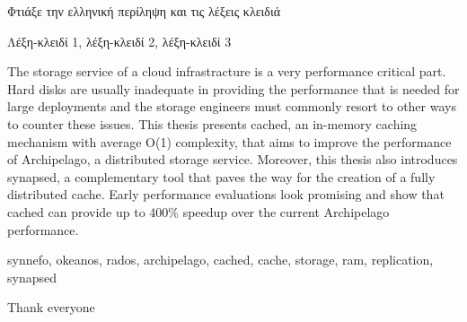 \begin{abstractgr}
	\todo Φτιάξε την ελληνική περίληψη και τις λέξεις κλειδιά
\begin{keywordsgr}
  	Λέξη-κλειδί 1, λέξη-κλειδί 2, λέξη-κλειδί 3
\end{keywordsgr}
\end{abstractgr}

\begin{abstracten}
	The storage service of a cloud infrastracture is a very performance 
	critical part. Hard disks are usually inadequate in providing the 
	performance that is needed for large deployments and the storage 
	engineers must commonly resort to other ways to counter these issues.  
	This thesis presents cached, an in-memory caching mechanism with 
	average O(1) complexity, that aims to improve the performance of 
	Archipelago, a distributed storage service.  Moreover, this thesis also 
	introduces synapsed, a complementary tool that paves the way for the 
	creation of a fully distributed cache. Early performance evaluations 
	look promising and show that cached can provide up to 400\% speedup 
	over the current Archipelago performance.
	\begin{keywordsen}
		synnefo, okeanos, rados, archipelago, cached, cache, storage, 
		ram, replication, synapsed
	\end{keywordsen}
\end{abstracten}

\begin{acknowledgementsgr}
	\todo Thank everyone
\end{acknowledgementsgr}



